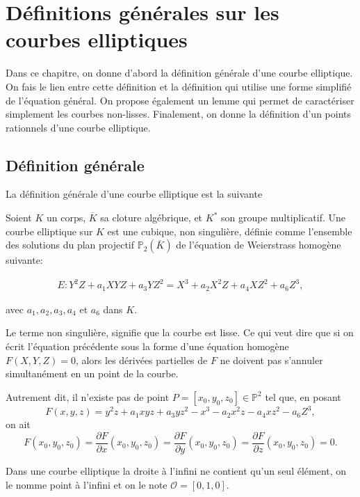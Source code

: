 \chapter{Définitions générales sur les courbes elliptiques}
\begin{center}
    Dans ce chapitre, on donne d'abord la définition générale d'une courbe elliptique. On fais
    le lien entre cette définition et la définition qui utilise une forme simplifié de
    l'équation général. On propose également un lemme qui permet de caractériser simplement les courbes
    non-lisses. Finalement, on donne la définition d'un points rationnels d'une courbe
    elliptique.
\end{center}

\section{Définition générale}

La définition générale d'une courbe elliptique est la suivante
\begin{definition}
    Soient $K$ un corps, $\overline{K}$ sa cloture algébrique, et $K^{*}$ son groupe
    multiplicatif. Une courbe elliptique sur $K$ est une cubique, non singulière,
    définie comme l'ensemble des solutions du plan projectif $\mathbb{P}_{2}(\overline{K})$ de
    l'équation de Weierstrass homogène suivante:

\begin{align}
\label{eq:geneEll}
E: Y^2Z+a_1XYZ+a_3YZ^2 = X^3 +a_2X^2Z+a_4XZ^2+a_6Z^3
,\end{align}

avec $a_1,a_2,a_3,a_4$ et $a_6$ dans $K$.
\end{definition}
Le terme non singulière, signifie que la courbe est lisse. Ce qui veut dire que si on écrit
l'équation précédente sous la forme d'une équation homogène $F(X,Y,Z)=0$, alors les dérivées
partielles de $F$ ne doivent pas s'annuler simultanément en un point de la courbe.

Autrement dit, il n'existe pas de point $P = \left[ x_0,y_0,z_0 \right] \in \mathbb{P}^2$ tel
que, en posant
\[
F(x,y,z) = y^2z+a_1xyz+a_3yz^2 - x^3-a_2x^2z-a_4xz^2-a_6Z^3
,\] 
on ait
\[
F(x_0,y_0,z_0)=\frac{\partial{F}}{\partial{x}}(x_0,y_0,z_0) =
\frac{\partial{F}}{\partial{y}}(x_0,y_0,z_0) =
\frac{\partial{F}}{\partial{z}}(x_0,y_0,z_0) = 0
.\] 

Dans une courbe elliptique la droite à l'infini ne contient qu'un seul élément, on le nomme
point à l'infini et on le note $\mathcal{O} = [0,1,0]$.

